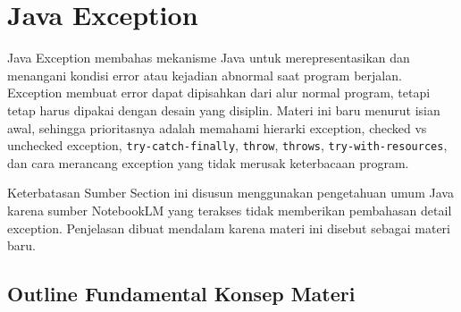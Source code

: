 \section{Java Exception}

Java Exception membahas mekanisme Java untuk merepresentasikan dan menangani kondisi error atau kejadian abnormal saat program berjalan. Exception membuat error dapat dipisahkan dari alur normal program, tetapi tetap harus dipakai dengan desain yang disiplin. Materi ini baru menurut isian awal, sehingga prioritasnya adalah memahami hierarki exception, checked vs unchecked exception, \texttt{try-catch-finally}, \texttt{throw}, \texttt{throws}, \texttt{try-with-resources}, dan cara merancang exception yang tidak merusak keterbacaan program.

\begin{cmt}{Keterbatasan Sumber}{}
Section ini disusun menggunakan pengetahuan umum Java karena sumber NotebookLM yang terakses tidak memberikan pembahasan detail exception. Penjelasan dibuat mendalam karena materi ini disebut sebagai materi baru.
\end{cmt}

\subsection{Outline Fundamental Konsep Materi}

